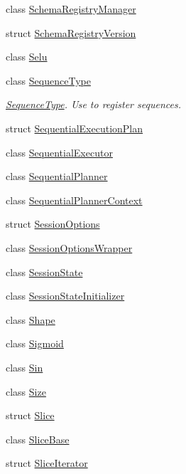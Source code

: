 \begin{DoxyCompactItemize}
class \mbox{\hyperlink{classonnxruntime_1_1SchemaRegistryManager}{Schema\+Registry\+Manager}}
\item 
struct \mbox{\hyperlink{structonnxruntime_1_1SchemaRegistryVersion}{Schema\+Registry\+Version}}
\item 
class \mbox{\hyperlink{classonnxruntime_1_1Selu}{Selu}}
\item 
class \mbox{\hyperlink{classonnxruntime_1_1SequenceType}{Sequence\+Type}}
\begin{DoxyCompactList}\small\item\em \mbox{\hyperlink{classonnxruntime_1_1SequenceType}{Sequence\+Type}}. Use to register sequences. \end{DoxyCompactList}\item 
struct \mbox{\hyperlink{structonnxruntime_1_1SequentialExecutionPlan}{Sequential\+Execution\+Plan}}
\item 
class \mbox{\hyperlink{classonnxruntime_1_1SequentialExecutor}{Sequential\+Executor}}
\item 
class \mbox{\hyperlink{classonnxruntime_1_1SequentialPlanner}{Sequential\+Planner}}
\item 
class \mbox{\hyperlink{classonnxruntime_1_1SequentialPlannerContext}{Sequential\+Planner\+Context}}
\item 
struct \mbox{\hyperlink{structonnxruntime_1_1SessionOptions}{Session\+Options}}
\item 
class \mbox{\hyperlink{classonnxruntime_1_1SessionOptionsWrapper}{Session\+Options\+Wrapper}}
\item 
class \mbox{\hyperlink{classonnxruntime_1_1SessionState}{Session\+State}}
\item 
class \mbox{\hyperlink{classonnxruntime_1_1SessionStateInitializer}{Session\+State\+Initializer}}
\item 
class \mbox{\hyperlink{classonnxruntime_1_1Shape}{Shape}}
\item 
class \mbox{\hyperlink{classonnxruntime_1_1Sigmoid}{Sigmoid}}
\item 
class \mbox{\hyperlink{classonnxruntime_1_1Sin}{Sin}}
\item 
class \mbox{\hyperlink{classonnxruntime_1_1Size}{Size}}
\item 
struct \mbox{\hyperlink{structonnxruntime_1_1Slice}{Slice}}
\item 
class \mbox{\hyperlink{classonnxruntime_1_1SliceBase}{Slice\+Base}}
\item 
struct \mbox{\hyperlink{structonnxruntime_1_1SliceIterator}{Slice\+Iterator}}
\item 

\end{DoxyCompactItemize}
